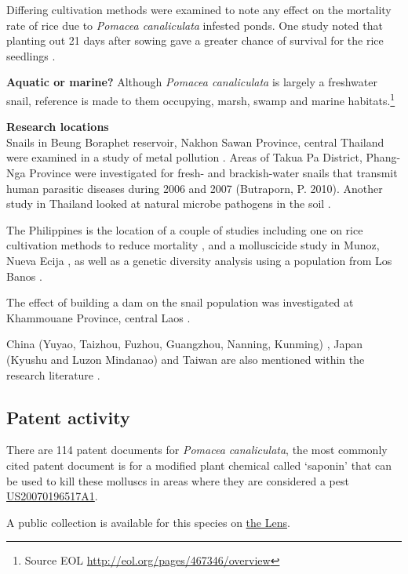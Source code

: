 \documentclass[]{book}
\let\rmarkdownfootnote\footnote%
\def\footnote{\protect\rmarkdownfootnote}
\theoremstyle{definition}
\theoremstyle{definition}
\theoremstyle{definition}
\theoremstyle{remark}
\begin{document}
Differing cultivation methods were examined to note any effect on the
mortality rate of rice due to \emph{Pomacea canaliculata} infested
ponds. One study noted that planting out 21 days after sowing gave a
greater chance of survival for the rice seedlings \citep{Horgan_2014}.

\textbf{Aquatic or marine?} Although \emph{Pomacea canaliculata} is
largely a freshwater snail, reference is made to them occupying, marsh,
swamp and marine habitats.\footnote{Source EOL
  \url{http://eol.org/pages/467346/overview}}

\textbf{Research locations}\\
Snails in Beung Boraphet reservoir, Nakhon Sawan Province, central
Thailand were examined in a study of metal pollution
\citep{Dummee_2012}. Areas of Takua Pa District, Phang-Nga Province were
investigated for fresh- and brackish-water snails that transmit human
parasitic diseases during 2006 and 2007 (Butraporn, P. 2010). Another
study in Thailand looked at natural microbe pathogens in the soil
\citep{Chobchuenchom_2003}.

The Philippines is the location of a couple of studies including one on
rice cultivation methods to reduce mortality \citep{Horgan_2014}, and a
molluscicide study in Munoz, Nueva Ecija \citep{De_La_Cruz_2001}, as
well as a genetic diversity analysis using a population from Los Banos
\citep{Bai_2011}.

The effect of building a dam on the snail population was investigated at
Khammouane Province, central Laos \citep{Brey_2015}.

China (Yuyao, Taizhou, Fuzhou, Guangzhou, Nanning, Kunming)
\citep{Bai_2011}, Japan (Kyushu and Luzon Mindanao) \citep{Wada_2011}
and Taiwan are also mentioned within the research literature
\citep{Baker_1998}.

\hypertarget{patent-activity-7}{%
\subsection{Patent activity}\label{patent-activity-7}}

There are 114 patent documents for \emph{Pomacea canaliculata}, the most
commonly cited patent document is for a modified plant chemical called
`saponin' that can be used to kill these molluscs in areas where they
are considered a pest
\href{https://www.lens.org/lens/patent/US_2007_0196517_A1}{US20070196517A1}.

A public collection is available for this species on
\href{https://www.lens.org/lens/collection/24984}{the Lens}.
\end{document}
